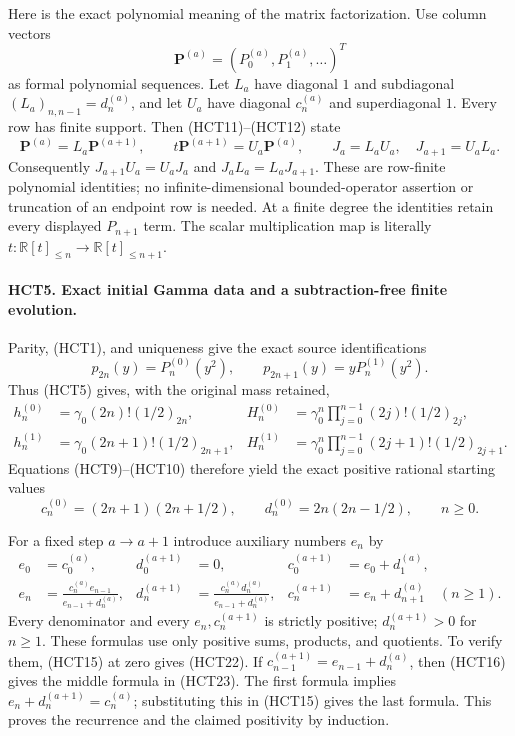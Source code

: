 Here is the exact polynomial meaning of the matrix factorization.
Use column vectors
\[\mathbf P^{(a)}=(P_0^{(a)},P_1^{(a)},\ldots)^T\]
as formal polynomial sequences. Let $L_a$ have diagonal $1$ and
subdiagonal $(L_a)_{n,n-1}=d_n^{(a)}$, and let $U_a$ have diagonal
$c_n^{(a)}$ and superdiagonal $1$. Every row has finite support.
Then (HCT11)--(HCT12) state
\begin{equation}\tag{HCT17}
 \mathbf P^{(a)}=L_a\mathbf P^{(a+1)},\qquad
 t\mathbf P^{(a+1)}=U_a\mathbf P^{(a)},\qquad
 J_a=L_aU_a,\quad J_{a+1}=U_aL_a.
\end{equation}
Consequently $J_{a+1}U_a=U_aJ_a$ and $J_aL_a=L_aJ_{a+1}$.
These are row-finite polynomial identities; no infinite-dimensional
bounded-operator assertion or truncation of an endpoint row is
needed. At a finite degree the identities retain every displayed
$P_{n+1}$ term. The scalar multiplication map is literally
$t:\mathbb R[t]_{\leq n}\to\mathbb R[t]_{\leq n+1}$.

\paragraph{HCT5. Exact initial Gamma data and a subtraction-free finite evolution.}
Parity, (HCT1), and uniqueness give the exact source identifications
\begin{equation}\tag{HCT18}
 p_{2n}(y)=P_n^{(0)}(y^2),\qquad
 p_{2n+1}(y)=yP_n^{(1)}(y^2).
\end{equation}
Thus (HCT5) gives, with the original mass retained,
\begin{align}
 h_n^{(0)}&=\gamma_0(2n)!(1/2)_{2n},&
 H_n^{(0)}&=\gamma_0^n\prod_{j=0}^{n-1}(2j)!(1/2)_{2j},\tag{HCT19}\\
 h_n^{(1)}&=\gamma_0(2n+1)!(1/2)_{2n+1},&
 H_n^{(1)}&=\gamma_0^n\prod_{j=0}^{n-1}(2j+1)!(1/2)_{2j+1}.\tag{HCT20}
\end{align}
Equations (HCT9)--(HCT10) therefore yield the exact positive
rational starting values
\begin{equation}\tag{HCT21}
 c_n^{(0)}=(2n+1)(2n+1/2),\qquad
 d_n^{(0)}=2n(2n-1/2),\qquad n\geq0.
\end{equation}

For a fixed step $a\to a+1$ introduce auxiliary numbers $e_n$ by
\begin{align}
 e_0&=c_0^{(a)},&d_0^{(a+1)}&=0,&
 c_0^{(a+1)}&=e_0+d_1^{(a)},\tag{HCT22}\\
 e_n&=\frac{c_n^{(a)}e_{n-1}}{e_{n-1}+d_n^{(a)}},&
 d_n^{(a+1)}&=\frac{c_n^{(a)}d_n^{(a)}}{e_{n-1}+d_n^{(a)}},&
 c_n^{(a+1)}&=e_n+d_{n+1}^{(a)}\quad(n\geq1).\tag{HCT23}
\end{align}
Every denominator and every $e_n,c_n^{(a+1)}$ is strictly positive;
$d_n^{(a+1)}>0$ for $n\geq1$. These formulas use only positive
sums, products, and quotients. To verify them, (HCT15) at zero
gives (HCT22). If $c_{n-1}^{(a+1)}=e_{n-1}+d_n^{(a)}$, then
(HCT16) gives the middle formula in (HCT23). The first formula
implies $e_n+d_n^{(a+1)}=c_n^{(a)}$; substituting this in
(HCT15) gives the last formula. This proves the recurrence and
the claimed positivity by induction.

